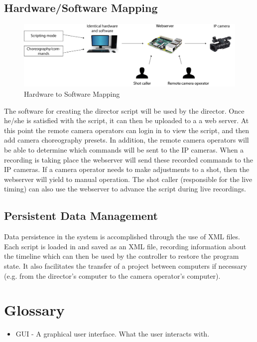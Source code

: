 \documentclass[11pt,twoside,a4paper]{article}
\begin{document}
\subsection{Hardware/Software Mapping}
\begin{figure}[H]
	\centering
	\includegraphics[width=\textwidth]{HWsoftwaremapping}
	\caption{Hardware to Software Mapping}
	\label{fig:mapping}
\end{figure}

The software for creating the director script will be used by the director. Once he/she is satisfied with the script, it can then be uploaded to a a web server. At this point the remote camera operators can login in to view the script, and then add camera choreography presets. In addition, the remote camera operators will be able to determine which commands will be sent to the IP cameras. When a recording is taking place the webserver will send these recorded commands to the IP cameras. If a camera operator needs to make adjustments to a shot, then the webserver will yield to manual operation. The shot caller (responsible for the live timing) can also use the webserver to advance the script during live recordings.

\subsection{Persistent Data Management}
Data persistence in the system is accomplished through the use of XML files. Each script is loaded in and saved as an XML file, recording information about the timeline which can then be used by the controller to restore the program state. It also facilitates the transfer of a project between computers if necessary (e.g. from the director's computer to the camera operator's computer).

\section{Glossary}
\begin{itemize}
  \item GUI - A graphical user interface. What the user interacts with.
\end{itemize}
\end{document}
